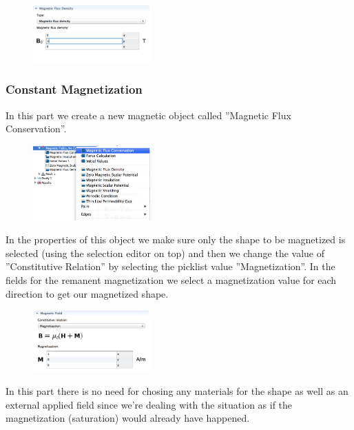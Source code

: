 \begin{figure}[H]
	\centering
  \includegraphics[width=0.4\textwidth]{Pictures/Screenshots/Sim18.png}
\end{figure}



\subsubsection{Constant Magnetization}

In this part we create a new magnetic object called ''Magnetic Flux Conservation''.\\

\begin{figure}[H]
	\centering
  \includegraphics[width=0.4\textwidth]{Pictures/Screenshots/Sim10.png}
\end{figure}
 
In the properties of this object we make sure only the shape to be magnetized is selected (using the selection editor on top) and then we change the value of ''Constitutive Relation'' by selecting the picklist value ''Magnetization''. In the fields for the remanent magnetization we select a magnetization value for each direction to get our magnetized shape. \\

\begin{figure}[H]
	\centering
  \includegraphics[width=0.4\textwidth]{Pictures/Screenshots/Sim11.png}
\end{figure}
 
 In this part there is no need for chosing any materials for the shape as well as an external applied field since we're dealing with the situation as if the magnetization (saturation) would already have happened.
 
